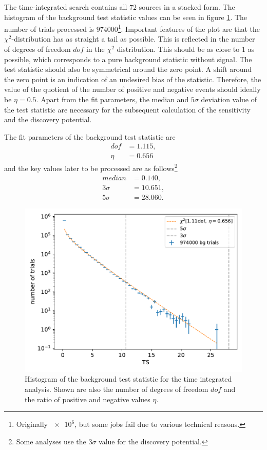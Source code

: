 The time-integrated search contains all $\num{72}$ sources in a stacked form.
The histogram of the background test statistic values can be seen in figure \ref{fig:bg_ts_time_int}.
The number of trials processed is $\num{974000}$\footnote{Originally $\num{e6}$, but some jobs fail due to various technical reasons.}.
Important features of the plot are that the $\chi^2$-distribution has as straight a tail as possible.
This is reflected in the number of degrees of freedom $dof$ in the $\chi^2$ distribution.
This should be as close to 1 as possible, which corresponds to a pure background statistic without signal.
The test statistic should also be symmetrical around the zero point.
A shift around the zero point is an indication of an undesired bias of the statistic.
Therefore, the value of the quotient of the number of positive and negative events should ideally be $\eta = \num{0.5}$.
Apart from the fit parameters, the median and $5\sigma$ deviation value of the test statistic are necessary for the subsequent calculation of the sensitivity and the discovery potential.

The fit parameters of the background test statistic are
\begin{align}
  dof &= \num{1.115},\\
  \eta &= \num{0.656}
\end{align}
and the key values later to be processed are as follows\footnote{Some analyses use the $3\sigma$ value for the discovery potential.}
\begin{align}
  median &= \num{0.140},\\
  3\sigma &= \num{10.651},\\
  5\sigma &= \num{28.060}.
\end{align}

\begin{figure}
    \centering
    \includegraphics[width=\linewidth]{Plots/05_csky/9_years_gfu_gold_bg_new.pdf}
    \caption{Histogram of the background test statistic for the time integrated analysis. Shown are also the number of degrees of freedom $dof$ and the ratio of positive and negative values $\eta$.}
    \label{fig:bg_ts_time_int}
\end{figure}

